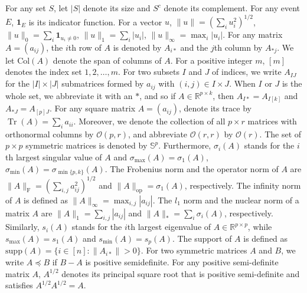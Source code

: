 \documentclass[11pt]{article}
\newcommand{\nb}[1]{\textcolor{orange}{\texttt{[#1]}}}
\newcommand{\gsc}[1]{\textcolor{blue}{\texttt{[#1]}}}
\newcommand{\blue}{\color{black}}
\newcommand{\eigen}{s} %
\DeclareMathOperator{\Tr}{Tr}
\newcommand{\0}{{\mathbf{0}}}
\newcommand{\op}{{\mathrm{op}}}
\begin{document}
For any set $S$, let $|S|$ denote its size and $S^c$ denote its complement. 
For any event $E$, $\mathbf{1}_E$ is its indicator function. 
For a vector $u$, $\|u\|={(\sum_i u_i^2)^{1/2}}$, $\|u\|_0=\sum_i \mathbf{1}_{u_i\neq 0}$, $\|u\|_1=\sum_i |u_i|$, $\|u\|_\infty = \max_i |u_i|.$ For any matrix $A=(a_{ij})$, the $i$th row of $A$ is denoted by $A_{i*}$ and the $j$th column by $A_{*j}$. 
We let $\text{Col}(A)$ denote the span of columns of $A$. 
For a positive integer $m$, $[m]$ denotes the index set ${1, 2,\dots ,m}$. 
For two subsets $I$ and $J$ of indices, we write $A_{IJ}$ for the $|I|\times|J|$ submatrices formed by $a_{ij}$ with $(i,j)\in I \times J$. 
When $I$ or $J$ is the whole set, we abbreviate it with an $*$, and so if $A \in \mathbb{R}^{p\times k}$, then $A_{I*} = A_{I[k]}$ and $A_{*J} =A_{[p]J}$. 
For any square matrix $A = (a_{ij})$, denote its trace by $\Tr(A) = \sum_i a_{ii}$. 
Moreover, 
we denote the collection of all
 $p\times r$ matrices with orthonormal columns by $\mathcal{O}(p,r)$, and abbreviate $\mathcal{O}(r,r)$ by
${\mathcal{O}(r)}$.
The set of $p\times p$ symmetric matrices is denoted by $\mathbb{S}^p$.
Furthermore, $\sigma_i(A)$ stands for the $i$th largest singular value of $A$ and
$\sigma_{\max}(A) = \sigma_1(A)$, $\sigma_{\min}(A) = \sigma_{\min\{p,k\}}(A)$. 
The Frobenius norm and the operator norm of $A$ are $\|A\|_\mathrm{F} =({\sum_{i,j}a_{ij}^2})^{1/2}$ and $\|A\|_\op = \sigma_1(A)$, respectively. 
The infinity norm of $A$ is defined as $\|A\|_\infty = \max_{i, j} |a_{ij}|$. 
The $l_1$ norm and the nuclear norm of a matrix $A$ are $\|A\|_1=\sum_{i,j}|a_{ij}|$ and $\|A\|_*=\sum_i \sigma_i(A)$, respectively. 
Similarly, $\eigen_i(A)$ stands for the $i$th largest eigenvalue of $A\in \mathbb{R}^{p\times p} $, while
$\eigen_{\max}(A) = \eigen_1(A)$ and $\eigen_{\min}(A) = \eigen_{p}(A)$.
The support of $A$ is
defined as $\mathrm{supp}(A) = \{i\in[n] : \|A_{i*}\| > 0\}$. 
For two symmetric matrices $A$ and $B$, we write $A\preceq B$ if $B-A$ is positive semidefinite. 
For any positive semi-definite matrix $A$, $A^{1/2}$ denotes its principal square root that is positive semi-definite and satisfies $A^{1/2}A^{1/2} = A$. 
\end{document}

